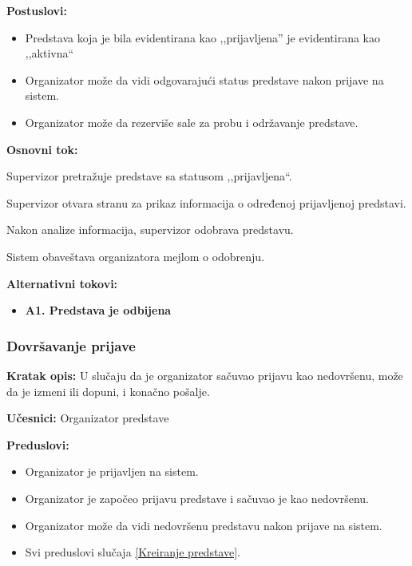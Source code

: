 \documentclass[a4paper]{article}
\begin{document}
\noindent\textbf{Postuslovi:} 
  \begin{itemize}
    \item Predstava koja je bila evidentirana kao ,,prijavljena'' je evidentirana kao ,,aktivna``
    \item Organizator može da vidi odgovarajući status predstave nakon prijave na sistem.
    \item Organizator može da rezerviše sale za probu i održavanje predstave. 
  \end{itemize}

\noindent\textbf{Osnovni tok:}
  \begin{legal}
    \item Supervizor pretražuje predstave sa statusom ,,prijavljena``.
    \item Supervizor otvara stranu za prikaz informacija o određenoj prijavljenoj predstavi. 
    \item Nakon analize informacija, supervizor odobrava predstavu. 
    \item Sistem obaveštava organizatora mejlom o odobrenju. 
  \end{legal}

\noindent\textbf{Alternativni tokovi:} 
\begin{itemize}
  \item \textbf{A1. Predstava je odbijena} 
\end{itemize}


\subsubsection{Dovršavanje prijave} \label{Dovršavanje prijave}
\noindent\textbf{Kratak opis:} U slučaju da je organizator sačuvao prijavu kao nedovršenu, može da je izmeni ili dopuni, i konačno pošalje. 

\noindent\textbf{Učesnici:} Organizator predstave

\noindent\textbf{Preduslovi:}
  \begin{itemize}
    \item Organizator je prijavljen na sistem.
    \item Organizator je započeo prijavu predstave i sačuvao je kao nedovršenu.
    \item Organizator može da vidi nedovršenu predstavu nakon prijave na sistem.
    \item Svi preduslovi slučaja \ref{Kreiranje predstave}.
  \end{itemize}
\end{document}
